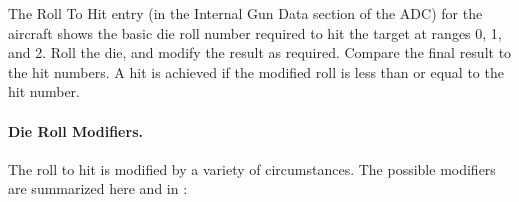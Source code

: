 The Roll To Hit entry (in the Internal Gun Data section of the ADC) for the aircraft shows the basic die roll number required to hit the target at ranges 0, 1, and 2. Roll the die, and modify the result as required. Compare the final result to the hit numbers. A hit is achieved if the modified roll is less than or equal to the hit number.


\paragraph{Die Roll Modifiers.} 

The roll to hit is modified by a variety of circumstances. The possible modifiers are summarized here and in :



